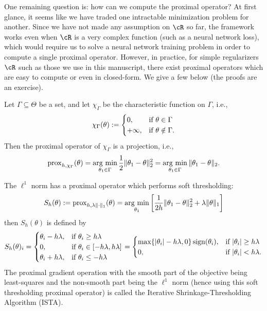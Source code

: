 \documentclass[../../book-main.tex]{subfiles}
\begin{document}
One remaining question is: how can we compute the proximal operator? At first
glance, it seems like we have traded one intractable minimization problem for
another. Since we have not made any assumption on \(\cR\) so far, the framework
works even when \(\cR\) is a very complex function (such as a neural network
loss), which would require us to solve a neural network training problem in
order to compute a single proximal operator. However, in practice, for simple
regularizers \(\cR\) such as those we use in this manuscript, there exist
proximal operators which are easy to compute or even in closed-form. We give
a few below (the proofs are an exercise).

\begin{example}\label{example:prox-of-characteristic-function}
    Let \(\Gamma \subseteq \Theta\) be a set, and let \(\chi_{\Gamma}\) be the characteristic function on \(\Gamma\), i.e.,
    \begin{equation}
        \chi_{\Gamma}(\theta) := \begin{cases}0, & \text{if}\ \theta \in \Gamma \\ +\infty, & \text{if}\ \theta \notin \Gamma.\end{cases}
    \end{equation}
    Then the proximal operator of \(\chi_{\Gamma}\) is a projection, i.e.,
    \begin{equation}
        \prox_{h, \chi_{\Gamma}}(\theta) = \argmin_{\theta_{1} \in \Gamma}\frac{1}{2}\norm{\theta_{1} - \theta}_{2}^{2} = \argmin_{\theta_{1} \in \Gamma}\norm{\theta_{1} - \theta}_{2}.
    \end{equation}
\end{example}

\begin{example}\label{example:prox-of-l1}
    The \(\ell^{1}\) norm has a proximal operator which performs soft thresholding:
    \begin{equation}
        S_{h}(\theta) := \prox_{h, \lambda \norm{\cdot}_{1}}(\theta) = \argmin_{\theta_{1}}\bs{\frac{1}{2h}\norm{\theta_{1} - \theta}_{2}^{2} + \lambda\norm{\theta}_{1}}
    \end{equation}
    then \(S_{h}(\theta)\) is defined by 
    \begin{equation}
        S_{h}(\theta)_{i} = \casework{\theta_{i} - h\lambda, & \text{if}\ \theta_{i} \geq h\lambda \\ 0, & \text{if}\ \theta_{i} \in [-h\lambda, h\lambda] \\ \theta_{i} + h\lambda, & \text{if}\ \theta_{i} \leq -h\lambda} = \casework{\max\{\abs{\theta_{i}} - h\lambda, 0\}\sign(\theta_{i}), & \text{if}\ \abs{\theta_{i}} \geq h\lambda \\ 0, & \text{if}\ \abs{\theta_{i}} < h\lambda.}
    \end{equation}
    The proximal gradient operation with the smooth part of the objective being least-squares and the non-smooth part being the \(\ell^{1}\) norm (hence using this soft thresholding proximal operator) is called the Iterative Shrinkage-Thresholding Algorithm (ISTA).
\end{example}
\end{document}
